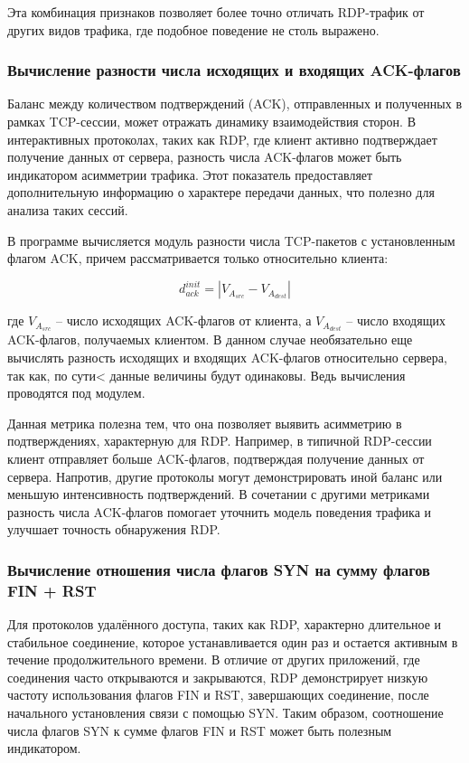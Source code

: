 \documentclass[bachelor, och, coursework]{SCWorks}
\begin{document}
Эта комбинация признаков позволяет более точно отличать RDP-трафик от других видов трафика, где подобное поведение не столь выражено.

\subsubsection{Вычисление разности числа исходящих и входящих ACK-флагов}

Баланс между количеством подтверждений (ACK), отправленных и полученных в рамках TCP-сессии, может отражать динамику 
взаимодействия сторон. В интерактивных протоколах, таких как RDP, где клиент активно подтверждает получение данных от 
сервера, разность числа ACK-флагов может быть индикатором асимметрии трафика. Этот показатель предоставляет дополнительную 
информацию о характере передачи данных, что полезно для анализа таких сессий.

В программе вычисляется модуль разности числа TCP-пакетов с установленным флагом ACK, причем рассматривается только относительно клиента:

\begin{equation}
  d_{ack}^{init} = | V_{A_{src}} - V_{A_{dest}} |
\end{equation}

где $V_{A_{src}}$ -- число исходящих ACK-флагов от клиента, а $V_{A_{dest}}$ -- число входящих ACK-флагов, получаемых клиентом. В данном случае необязательно
еще вычислять разность исходящих и входящих ACK-флагов относительно сервера, так как, по сути< данные величины будут одинаковы. Ведь вычисления проводятся под модулем.

Данная метрика полезна тем, что она позволяет выявить асимметрию в подтверждениях, характерную для RDP. Например, в типичной RDP-сессии 
клиент отправляет больше ACK-флагов, подтверждая получение данных от сервера. Напротив, другие протоколы могут демонстрировать иной баланс 
или меньшую интенсивность подтверждений. В сочетании с другими метриками разность числа ACK-флагов помогает уточнить модель поведения трафика 
и улучшает точность обнаружения RDP.

\subsubsection{Вычисление отношения числа флагов SYN на сумму флагов FIN + RST}


Для протоколов удалённого доступа, таких как RDP, характерно длительное и стабильное 
соединение, которое устанавливается один раз и остается активным в течение продолжительного времени. В отличие от других приложений, 
где соединения часто открываются и закрываются, RDP демонстрирует низкую частоту использования флагов FIN и RST, завершающих соединение, 
после начального установления связи с помощью SYN. Таким образом, соотношение числа флагов SYN к сумме флагов FIN и RST может быть полезным индикатором.
\end{document}
